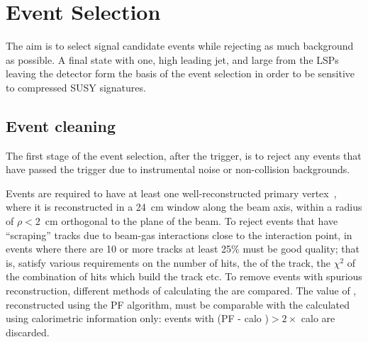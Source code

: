 \section{Event Selection}
\label{sec:ANA}

The aim is to select signal candidate events while rejecting as much background as possible.
A final state with one, high \pt leading jet, and large \MET from the LSPs leaving the detector form the basis of the event selection in order to be sensitive to compressed \ac{SUSY} signatures.

\subsection{Event cleaning}

The first stage of the event selection, after the trigger, is to reject any events that have passed the trigger due to instrumental noise or non-collision backgrounds.

Events are required to have at least one well-reconstructed primary vertex~\cite{bib:ANA_Tk}, where it is reconstructed in a 24~cm window along the beam axis, within a radius of $\rho<2$~cm orthogonal to the plane of the beam. %
To reject events that have ``scraping'' tracks due to beam-gas interactions close to the interaction point, in events where there are 10 or more tracks at least 25\% must be good quality; that is, satisfy various requirements on the number of hits, the \pt of the track, the $\chi^{2}$ of the combination of hits which build the track etc.
To remove events with spurious \MET reconstruction, different methods of calculating the \MET are compared. The value of \MET, reconstructed using the \ac{PF} algorithm, must be comparable with the \MET calculated using calorimetric information only: events with (PF \MET - calo \MET)$ > 2 \times$ calo \MET are discarded.





